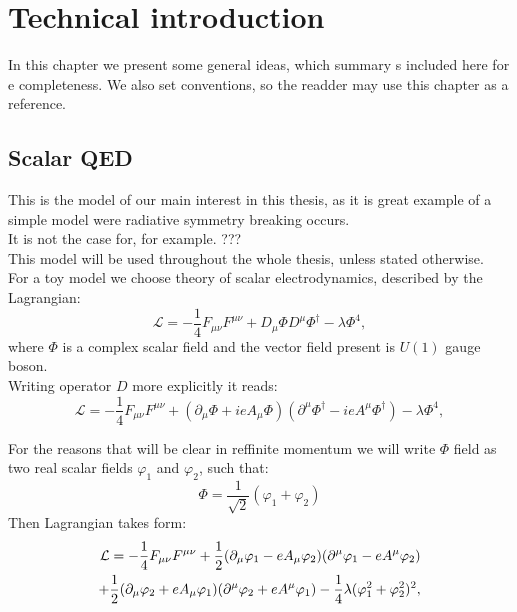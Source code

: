 \chapter{Technical introduction}

In this chapter we present some general ideas, which summary s included here for e completeness. 
We also set conventions, so the readder may use this chapter as a reference.

\section{Scalar QED}
This is the model of our main interest in this thesis, as it is great example of a simple 
model were radiative symmetry breaking occurs. \\

It is not the case for, for example. ??? \smalltodo \\

This model will be used throughout the whole thesis, unless stated otherwise. \\

For a toy model we choose theory of scalar electrodynamics, described by the Lagrangian:
\begin{equation}
\mathcal{L} = -\frac{1}{4}F_{\mu\nu}F^{\mu\nu}+D_\mu\Phi D^\mu\Phi^\dag-\lambda\Phi^4,
\end{equation}
where $\Phi$ is a complex scalar field and the vector field present is $U(1)$ gauge boson. \\

Writing operator $D$ more explicitly it reads:
\begin{equation}
\mathcal{L} = -\frac{1}{4}F_{\mu\nu}F^{\mu\nu}+(\partial_\mu\Phi + ieA_\mu\Phi) 
(\partial^\mu\Phi^\dag-ieA^\mu\Phi^\dag)-\lambda\Phi^4,
\end{equation}

For the reasons that will be clear in ref{finite momentum} we will write $\Phi$ 
field as two real scalar fields 
$\varphi_1$ and $\varphi_2$, such that:
\begin{equation}
\Phi = \frac{1}{\sqrt{2}}(\varphi_1+\varphi_2)
\end{equation}
Then Lagrangian takes form:
\begin{align}
\mathcal{L} = -\frac{1}{4}F_{\mu\nu}F^{\mu\nu}+ \frac{1}{2}(\partial_\mu\varphi_1 - eA_\mu\varphi_2)
(\partial^\mu\varphi_1 - eA^\mu\varphi_2)  \\
+\frac{1}{2}(\partial_\mu\varphi_2+eA_\mu\varphi_1)(\partial^\mu\varphi_2+eA^\mu\varphi_1) 
-\frac{1}{4}\lambda(\varphi_1^2+\varphi_2^2)^2,\notag
\end{align}

